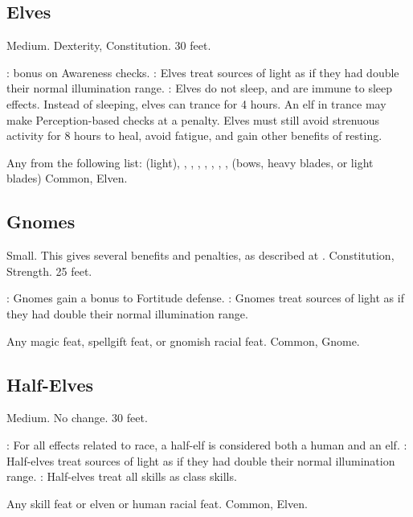 \subsection{Elves}
 Medium.
  Dexterity,  Constitution.
 30 feet.
\begin{itemize}
    :  bonus on Awareness checks.
    : Elves treat sources of light as if they had double their normal illumination range.
    : Elves do not sleep, and are immune to sleep effects. Instead of sleeping, elves can trance for 4 hours. An elf in trance may make Perception-based checks at a  penalty. Elves must still avoid strenuous activity for 8 hours to heal, avoid fatigue, and gain other benefits of resting.
\end{itemize}
 Any from the following list:  (light), , , , , , , ,  (bows, heavy blades, or light blades)
 Common, Elven.

\subsection{Gnomes}
 Small. This gives several benefits and penalties, as described at .
  Constitution,  Strength.
 25 feet.
\begin{itemize}
    : Gnomes gain a  bonus to Fortitude defense.
    : Gnomes treat sources of light as if they had double their normal illumination range.
\end{itemize}
 Any magic feat, spellgift feat, or gnomish racial feat.
 Common, Gnome.

\subsection{Half-Elves}
 Medium.
 No change.
 30 feet.
\begin{itemize}
    : For all effects related to race, a half-elf is considered both a human and an elf.
    : Half-elves treat sources of light as if they had double their normal illumination range.
    : Half-elves treat all skills as class skills.
\end{itemize}
 Any skill feat or elven or human racial feat.
 Common, Elven.


